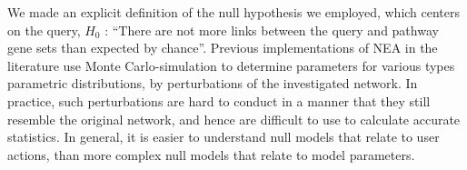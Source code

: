 \documentclass[10pt,letterpaper]{article}
\begin{document}
We made an explicit definition of the null hypothesis we employed, which centers on the query, $H_0$ : ``There are not more links between the query and pathway gene sets than expected by chance''. Previous implementations of NEA in the literature use Monte Carlo-simulation to determine parameters for various types parametric distributions, by perturbations of the investigated network. In practice, such perturbations are hard to conduct in a manner that they still resemble the original network, and hence are difficult to use to calculate accurate statistics. In general, it is easier to understand null models that relate to user actions, than more complex null models that relate to model parameters.


\end{document}
